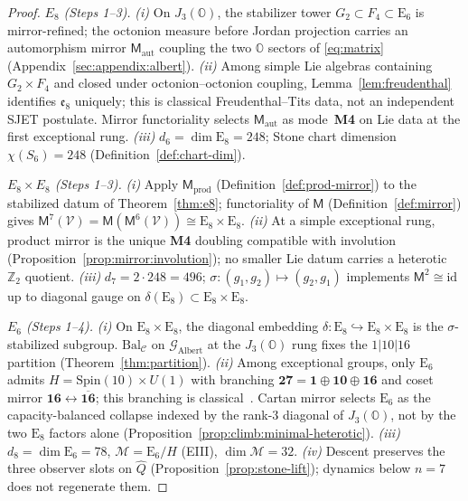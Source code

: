 \documentclass[aps,prd,onecolumn,amsmath,amssymb,nofootinbib,11pt]{revtex4-2}
\numberwithin{equation}{section}
\theoremstyle{plain}
\theoremstyle{definition}
\theoremstyle{remark}
\newcommand{\Oct}{\mathbb{O}}
\newcommand{\jalg}{J_3(\mathbb{O})}
\newcommand{\E}[1]{\mathrm{E}_{#1}}
\newcommand{\Spin}{\mathrm{Spin}}
\newcommand{\Void}{\mathcal{V}}
\newcommand{\Mirror}{\mathsf{M}}
\begin{document}
\begin{proof}
\emph{$E_8$ (Steps 1--3).}
\emph{(i)} On $\jalg$, the stabilizer tower $G_2\subset F_4\subset\E{6}$ is
mirror-refined; the octonion measure before Jordan projection carries an
automorphism mirror $\Mirror_{\mathrm{aut}}$ coupling the two $\Oct$ sectors of
\eqref{eq:matrix} (Appendix~\ref{sec:appendix:albert}).
\emph{(ii)} Among simple Lie algebras containing $G_2\times F_4$ and closed
under octonion--octonion coupling, Lemma~\ref{lem:freudenthal} identifies
$\mathfrak{e}_8$ uniquely; this is classical Freudenthal--Tits data, not an
independent SJET postulate. Mirror functoriality selects
$\Mirror_{\mathrm{aut}}$ as mode~\textbf{M4} on Lie data at the first
exceptional rung.
\emph{(iii)} $d_6=\dim\E{8}=248$; Stone chart dimension $\chi(S_6)=248$
(Definition~\ref{def:chart-dim}).

\emph{$E_8\times E_8$ (Steps 1--3).}
\emph{(i)} Apply $\Mirror_{\mathrm{prod}}$ (Definition~\ref{def:prod-mirror})
to the stabilized datum of Theorem~\ref{thm:e8}; functoriality of $\Mirror$
(Definition~\ref{def:mirror}) gives
$\Mirror^7(\Void)=\Mirror(\Mirror^6(\Void))\cong\E{8}\times\E{8}$.
\emph{(ii)} At a simple exceptional rung, product mirror is the unique
\textbf{M4} doubling compatible with involution
(Proposition~\ref{prop:mirror:involution}); no smaller Lie datum carries a
heterotic $\mathbb{Z}_2$ quotient.
\emph{(iii)} $d_7=2\cdot248=496$; $\sigma:(g_1,g_2)\mapsto(g_2,g_1)$
implements $\Mirror^2\cong\mathrm{id}$ up to diagonal gauge on
$\delta(\E{8})\subset\E{8}\times\E{8}$.

\emph{$E_6$ (Steps 1--4).}
\emph{(i)} On $\E{8}\times\E{8}$, the diagonal embedding
$\delta:\E{8}\hookrightarrow\E{8}\times\E{8}$ is the $\sigma$-stabilized
subgroup. $\mathrm{Bal}_{\mathcal{C}}$ on $\mathcal{G}_{\mathrm{Albert}}$ at
the $\jalg$ rung fixes the $1|10|16$ partition
(Theorem~\ref{thm:partition}).
\emph{(ii)} Among exceptional groups, only $\E{6}$ admits
$H=\Spin(10)\times U(1)$ with branching
$\mathbf{27}=\mathbf{1}\oplus\mathbf{10}\oplus\mathbf{16}$ and coset mirror
$\mathbf{16}\leftrightarrow\overline{\mathbf{16}}$; this branching is
classical~\cite{SpringerVeldkamp2000}. Cartan mirror selects $\E{6}$ as the
capacity-balanced collapse indexed by the rank-$3$ diagonal of $\jalg$, not by
the two $\E{8}$ factors alone (Proposition~\ref{prop:climb:minimal-heterotic}).
\emph{(iii)} $d_8=\dim\E{6}=78$, $\mathcal{M}=\E{6}/H$ (EIII),
$\dim\mathcal{M}=32$.
\emph{(iv)} Descent preserves the three observer slots on $\hat Q$
(Proposition~\ref{prop:stone-lift}); dynamics below $n=7$ does not regenerate
them.
\end{proof}
\end{document}

